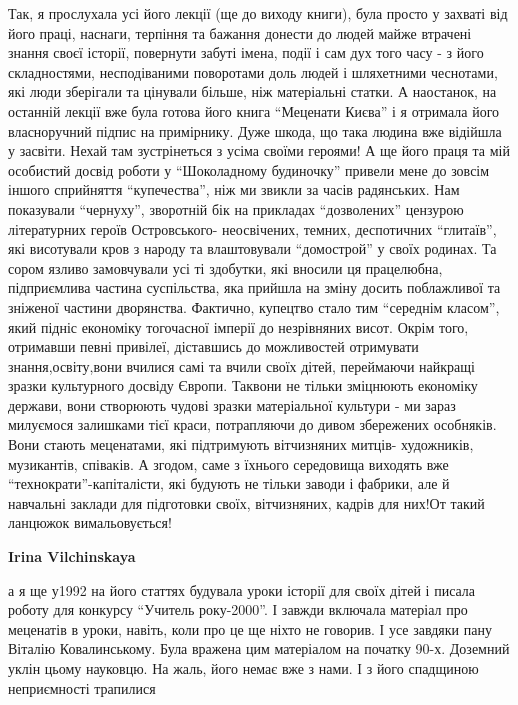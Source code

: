 \begin{itemize}
\begin{itemize}
\begin{itemize}
Так, я прослухала усі його лекції (ще до виходу книги), була просто у захваті
від його праці, наснаги, терпіння та бажання донести до людей майже втрачені
знання своєї історії, повернути забуті імена, події і сам дух того часу - з
його складностями, несподіваними поворотами доль людей і шляхетними чеснотами,
які люди зберігали та цінували більше, ніж матеріальні статки. А наостанок, на
останній лекції вже була готова його книга \enquote{Меценати Києва} і я
отримала його власноручний підпис на примірнику. Дуже шкода, що така людина вже
відійшла у засвіти. Нехай там зустрінеться з усіма своїми героями! А ще його
праця та мій особистий досвід роботи у \enquote{Шоколадному будиночку} привели
мене до зовсім іншого сприйняття \enquote{купечества}, ніж ми звикли за часів
радянських. Нам показували \enquote{чернуху}, зворотній бік на прикладах
\enquote{дозволених} цензурою літературних героїв Островського- неосвічених,
темних, деспотичних \enquote{глитаїв}, які висотували кров з народу та
влаштовували \enquote{домострой} у своїх родинах. Та сором язливо замовчували
усі ті здобутки, які вносили ця працелюбна, підприємлива частина суспільства,
яка прийшла на зміну досить поблажливої та зніженої частини дворянства.
Фактично, купецтво стало тим \enquote{середнім класом}, який підніс економіку
тогочасної імперії до незрівняних висот. Окрім того, отримавши певні привілеї,
діставшись до можливостей отримувати знання,освіту,вони вчилися самі та вчили
своїх дітей, переймаючи найкращі зразки культурного досвіду Європи. Таквони не
тільки зміцнюють економіку держави, вони створюють чудові зразки матеріальної
культури - ми зараз милуємося залишками тієї краси, потрапляючи до дивом
збережених особняків. Вони стають меценатами, які підтримують вітчизняних
митців- художників, музикантів, співаків. А згодом, саме з їхнього середовища
виходять вже \enquote{технократи}-капіталісти, які будують не тільки заводи і
фабрики, але й навчальні заклади для підготовки своїх, вітчизняних, кадрів для
них!От такий ланцюжок вимальовується!

\textbf{Irina Vilchinskaya} 

а я ще у1992 на його статтях будувала уроки історії для своїх дітей і писала
роботу для конкурсу \enquote{Учитель року-2000}. І завжди включала матеріал про
меценатів в уроки, навіть, коли про це ще ніхто не говорив. І усе завдяки пану
Віталію Ковалинському. Була вражена цим матеріалом на початку 90-х. Доземний
уклін цьому науковцю. На жаль, його немає вже з нами. І з його спадщиною
неприємності трапилися


\end{itemize}
\end{itemize}
\end{itemize}
